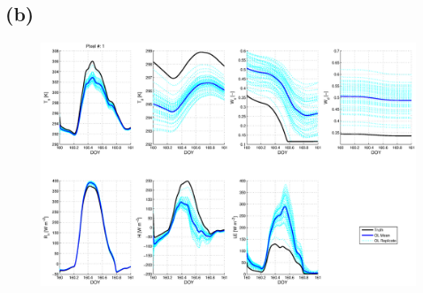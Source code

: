 \documentclass[letterpaper]{tufte-handout}
\begin{document}
\subsection{(b)}
\begin{figure}
  \includegraphics[width=\textwidth]{3b}
  \caption{}
\end{figure}
\end{document}
